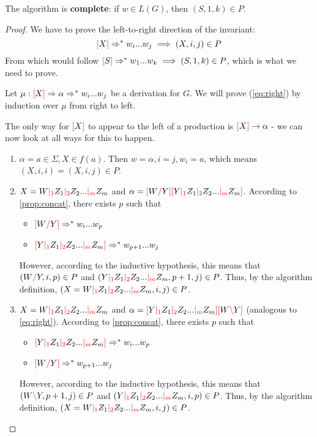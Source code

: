 \documentclass[main.tex]{subfiles}
\begin{document}
\begin{prop}
    The algorithm is \textbf{complete}: if $w \in L(G)$, then $(S, 1, k) \in P$.
\end{prop}
\begin{proof}
    We have to prove the left-to-right direction of the invariant:
    \begin{equation}\label{eq:right}
        \textcolor{red}{[} X \textcolor{red}{]} \Rightarrow^* w_i ... w_j \implies (X, i, j) \in P
    \end{equation}
    From which would follow $ \textcolor{red}{[} S \textcolor{red}{]} \Rightarrow^* w_1 ... w_k \implies (S, 1, k) \in P$,
    which is what we need to prove.

    Let $\mu: \textcolor{red}{[} X \textcolor{red}{]} \Rightarrow \alpha \Rightarrow^* w_i ... w_j$
    be a derivation for $G$. We will prove (\ref{eq:right}) by induction over
    $\mu$ from right to left.

    The only way for $\textcolor{red}{[} X \textcolor{red}{]}$ to appear to the left
    of a production is $\textcolor{red}{[} X \textcolor{red}{]} \rightarrow \alpha$ - we can now look at
    all ways for this to happen.
    \begin{enumerate}
        \item $\alpha = a \in \Sigma, X \in f(a)$. Then $w = \alpha, i = j, w_i = a$,
            which means $(X, i, i) = (X, i, j) \in P$.
        \item $X = W \textcolor{red}{|_{1}} Z_1 \textcolor{red}{|_{2}} Z_2 ... \textcolor{red}{|_{m}} Z_m$ and
            $\alpha = \textcolor{red}{[} W \textcolor{red}{/} Y \textcolor{red}{]} \textcolor{red}{[} Y \textcolor{red}{|_{1}} Z_1 \textcolor{red}{|_{2}} Z_2 ... \textcolor{red}{|_{m}} Z_m \textcolor{red}{]}$.
            According to \cref{prop:concat}, there exists $p$ such that
            \begin{itemize}
                \item $\textcolor{red}{[} W \textcolor{red}{/} Y \textcolor{red}{]} \Rightarrow^* w_i ... w_p$
                \item $\textcolor{red}{[} Y \textcolor{red}{|_{1}} Z_1 \textcolor{red}{|_{2}} Z_2 ... \textcolor{red}{|_{m}} Z_m \textcolor{red}{]} \Rightarrow^* w_{p+1} ... w_j$
            \end{itemize}
            However, according to the inductive hypothesis, this means that
            $(W \textcolor{red}{/} Y, i, p) \in P$ and
            $(Y \textcolor{red}{|_{1}} Z_1 \textcolor{red}{|_{2}} Z_2 ... \textcolor{red}{|_{m}} Z_m, p + 1, j) \in P$. Thus,
            by the algorithm definition,
            $(X = W \textcolor{red}{|_{1}} Z_1 \textcolor{red}{|_{2}} Z_2 ... \textcolor{red}{|_{m}} Z_m, i, j) \in P$.
        \item $X = W \textcolor{red}{|_{1}} Z_1 \textcolor{red}{|_{2}} Z_2 ... \textcolor{red}{|_{m}} Z_m$ and
            $\alpha = \textcolor{red}{[} Y \textcolor{red}{|_{1}} Z_1 \textcolor{red}{|_{2}} Z_2 ... \textcolor{red}{|_{m}} Z_m \textcolor{red}{]} \textcolor{red}{[} W \textcolor{red}{\backslash} Y \textcolor{red}{]}$
            (analogous to \ref{eq:right}).
            According to \cref{prop:concat}, there exists $p$ such that
            \begin{itemize}
                \item $\textcolor{red}{[} Y \textcolor{red}{|_{1}} Z_1 \textcolor{red}{|_{2}} Z_2 ... \textcolor{red}{|_{m}} Z_m \textcolor{red}{]} \Rightarrow^* w_i ... w_p$
                \item $\textcolor{red}{[} W \textcolor{red}{/} Y \textcolor{red}{]} \Rightarrow^* w_{p + 1} ... w_j$
            \end{itemize}
            However, according to the inductive hypothesis, this means that
            $(W \textcolor{red}{\backslash} Y, p + 1, j) \in P$ and
            $(Y \textcolor{red}{|_{1}} Z_1 \textcolor{red}{|_{2}} Z_2 ... \textcolor{red}{|_{m}} Z_m, i, p) \in P$. Thus,
            by the algorithm definition,
            $(X = W \textcolor{red}{|_{1}} Z_1 \textcolor{red}{|_{2}} Z_2 ... \textcolor{red}{|_{m}} Z_m, i, j) \in P$.
    \end{enumerate}


\end{proof}
\end{document}
